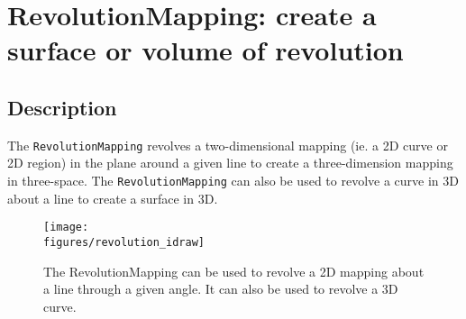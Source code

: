 \section{RevolutionMapping: create a surface or volume of revolution}

\subsection{Description}

The {\tt RevolutionMapping} revolves a two-dimensional mapping (ie. a 2D curve or 2D region)
in the plane around a given line to create
a three-dimension mapping in three-space. The {\tt RevolutionMapping} can also be used to revolve a 
curve in 3D about a line to create a surface in 3D.


\begin{figure}[ht]
  \begin{center}
   \texttt{[image: \\figures/revolution\_idraw]}
  \caption{The RevolutionMapping can be used to revolve a 2D mapping about a line 
           through a given angle. It can also be used to revolve a 3D curve.}
  \end{center}
\label{fig:RevolutionMapping}
\end{figure}

